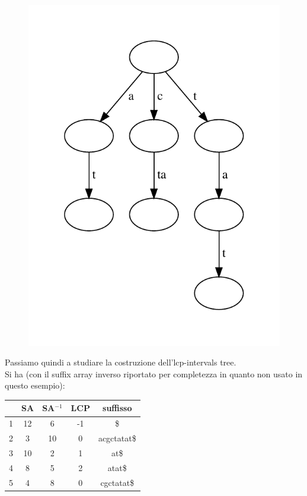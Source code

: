 \documentclass[a4paper,12pt, oneside]{book}
\begin{document}
\begin{esempio}
\begin{figure}[H]
    \includegraphics[scale = 0.6]{img/ass3nl.pdf}
  \end{figure}
  \newpage
  Passiamo quindi a studiare la costruzione dell'lcp-intervals tree.\\
  Si ha (con il suffix array inverso riportato per completezza in quanto non
  usato in questo esempio):
  \begin{table}[H]
    \centering
    \begin{tabular}{c|c|c|c|c|}
      & \textbf{SA} & \textbf{SA}$^{-1}$ & \textbf{LCP} & \textbf{suffisso} \\
      \hline
      1 & 12 & 6 & -1 & \$ \\
      2 & 3 & 10 & 0 & acgctatat\$  \\ 
      3 & 10 & 2 & 1 & at\$ \\ 
      4 & 8 & 5 & 2 & atat\$  \\ 
      5 & 4 & 8 & 0 & cgctatat\$  \\ 

\end{tabular}
\end{table}
\end{esempio}
\end{document}
